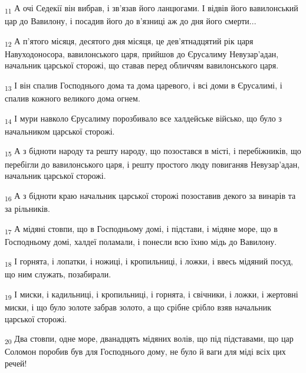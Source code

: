 \begin{tcolorbox}
\textsubscript{11} А очі Седекії він вибрав, і зв'язав його ланцюгами. І відвів його вавилонський цар до Вавилону, і посадив його до в'язниці аж до дня його смерти...
\end{tcolorbox}
\begin{tcolorbox}
\textsubscript{12} А п'ятого місяця, десятого дня місяця, це дев'ятнадцятий рік царя Навуходоносора, вавилонського царя, прийшов до Єрусалиму Невузар'адан, начальник царської сторожі, що ставав перед обличчям вавилонського царя.
\end{tcolorbox}
\begin{tcolorbox}
\textsubscript{13} І він спалив Господнього дома та дома царевого, і всі доми в Єрусалимі, і спалив кожного великого дома огнем.
\end{tcolorbox}
\begin{tcolorbox}
\textsubscript{14} І мури навколо Єрусалиму порозбивало все халдейське військо, що було з начальником царської сторожі.
\end{tcolorbox}
\begin{tcolorbox}
\textsubscript{15} А з бідноти народу та решту народу, що позостався в місті, і перебіжників, що перебігли до вавилонського царя, і решту простого люду повиганяв Невузар'адан, начальник царської сторожі.
\end{tcolorbox}
\begin{tcolorbox}
\textsubscript{16} А з бідноти краю начальник царської сторожі позоставив декого за винарів та за рільників.
\end{tcolorbox}
\begin{tcolorbox}
\textsubscript{17} А мідяні стовпи, що в Господньому домі, і підстави, і мідяне море, що в Господньому домі, халдеї поламали, і понесли всю їхню мідь до Вавилону.
\end{tcolorbox}
\begin{tcolorbox}
\textsubscript{18} І горнята, і лопатки, і ножиці, і кропильниці, і ложки, і ввесь мідяний посуд, що ним служать, позабирали.
\end{tcolorbox}
\begin{tcolorbox}
\textsubscript{19} І миски, і кадильниці, і кропильниці, і горнята, і свічники, і ложки, і жертовні миски, і що було золоте забрав золото, а що срібне срібло взяв начальник царської сторожі.
\end{tcolorbox}
\begin{tcolorbox}
\textsubscript{20} Два стовпи, одне море, дванадцять мідяних волів, що під підставами, що цар Соломон поробив був для Господнього дому, не було й ваги для міді всіх цих речей!
\end{tcolorbox}
